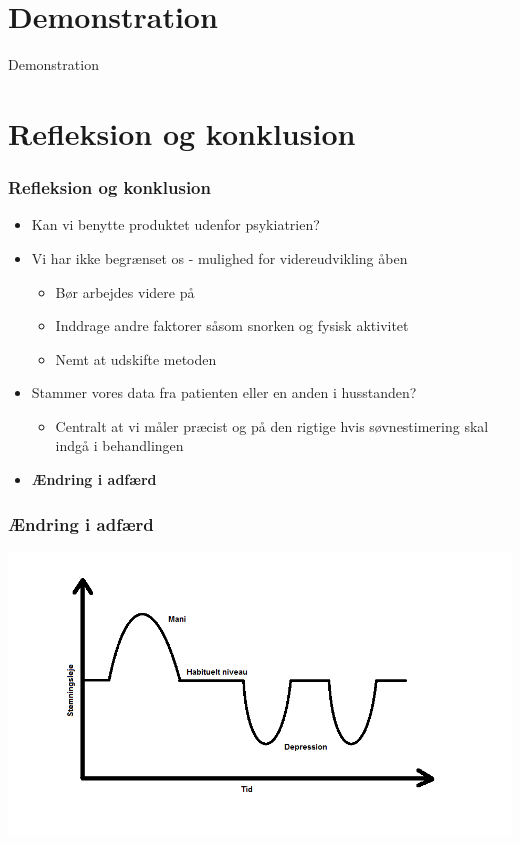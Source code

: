\section{Demonstration}
\begin{frame}
	Demonstration
\end{frame}


\section{Refleksion og konklusion}
\begin{frame}
\frametitle{Refleksion og konklusion}
\begin{itemize}
	\item Kan vi benytte produktet udenfor psykiatrien?
	\item Vi har ikke begrænset os - mulighed for videreudvikling åben
	\begin{itemize}
		\item Bør arbejdes videre på
		\item Inddrage andre faktorer såsom snorken og fysisk aktivitet
		\item Nemt at udskifte metoden
	\end{itemize}
	\item Stammer vores data fra patienten eller en anden i husstanden?
	\begin{itemize}
		\item Centralt at vi måler præcist og på den rigtige hvis søvnestimering skal indgå i behandlingen
	\end{itemize}
	\item \textbf{Ændring i adfærd}
\end{itemize}
\end{frame}

\begin{frame}
\frametitle{Ændring i adfærd}

\includegraphics[scale=0.4]{affektivstemningsleje}
\end{frame}
